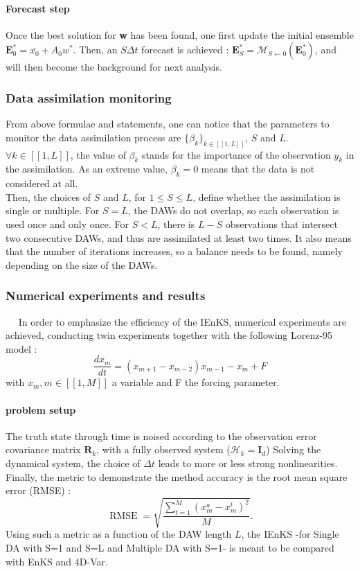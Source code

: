 \documentclass[a4,12pt]{article}
\numberwithin{equation}{section}
\begin{document}
\paragraph{Forecast step}
Once the best solution for \textbf{w} has been found, one first update the initial ensemble $\textbf{E}^{*}_0 = \bar{x_0} + A_{0}w^{*}$. Then, an $S\Delta t$ forecast is achieved : $\textbf{E}^{*}_S = \mathcal{M}_{S\leftarrow 0}(\textbf{E}^{*}_0)$, and will then become the background for next analysis.


\subsubsection{Data assimilation monitoring}
From above formulae and statements, one can notice that the parameters to monitor the data assimilation process are $\{\beta_k\}_{k \in [\![1,L]\!]}$, $S$ and $L$. \\
$\forall k \in [\![1,L]\!]$, the value of $\beta_k$ stands for the importance of the observation $y_k$ in the assimilation. As an extreme value, $\beta_k = 0$ means that the data is not considered at all. \\
Then, the choices of $S$ and $L$, for $1 \le S \le L$, define whether the assimilation is single or multiple. For $S = L$,  the DAWs do not overlap, so each observation is used once and only once. For $S < L$, there is  $L-S$ observations that intersect two consecutive DAWs, and thus are assimilated at least two times. It also means that the number of iterations increases, so a balance needs to be found, namely depending on the size of the DAWs.

\subsubsection{Numerical experiments and results}
~~ In order to emphasize the efficiency of the IEnKS, numerical experiments are achieved, conducting twin experiments together with the following Lorenz-95 model : \\
\begin{equation*}
\frac{dx_m}{dt} = (x_{m+1}-x_{m-2})x_{m-1} - x_m + F
\end{equation*}
with $x_m, m \in [\![1,M]\!]$ a variable and F the forcing parameter. \\
\paragraph{problem setup}
The truth state through time is noised according to the observation error covariance matrix $\textbf{R}_k$, with a fully observed system ($\mathcal{H}_k = \textbf{I}_d$) 
Solving the dynamical system, the choice of $\Delta t$ leads to more or less strong nonlinearities. \\
Finally, the metric to demonstrate the method accuracy is the root mean square error (RMSE) :
$$\operatorname{RMSE}= \sqrt{\frac{\sum_{t=1}^M (x_{m}^{a} - x_{m}^{t})^2}{M}}.$$
Using such a metric as a function of the DAW length $L$, the IEnKS -for Single DA with S=1 and S=L and Multiple DA with S=1- is meant to be compared with EnKS and 4D-Var.
\end{document}
